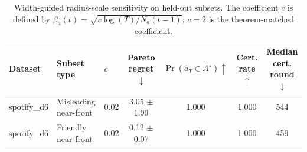 \begin{table}[t]
\centering
\caption{Width-guided radius-scale sensitivity on held-out subsets. The coefficient $c$ is defined by $\beta_a(t)=\sqrt{c\log(T)/N_a(t-1)}$; $c=2$ is the theorem-matched coefficient.}
\label{tab:app-width-sensitivity}
\scriptsize
\setlength{\tabcolsep}{3pt}
\begin{tabular}{lllcccc}
\toprule
Dataset & Subset type & $c$ & Pareto regret $\downarrow$ & $\Pr(\widehat a_T\in A^\star)\uparrow$ & Cert. rate $\uparrow$ & Median cert. round $\downarrow$ \\
\midrule
spotify\_d6 & Misleading near-front & 0.02 & 3.05 $\pm$ 1.99 & 1.000 & 1.000 & 544 \\
\midrule
spotify\_d6 & Friendly near-front & 0.02 & 0.12 $\pm$ 0.07 & 1.000 & 1.000 & 459 \\
\bottomrule
\end{tabular}
\end{table}
